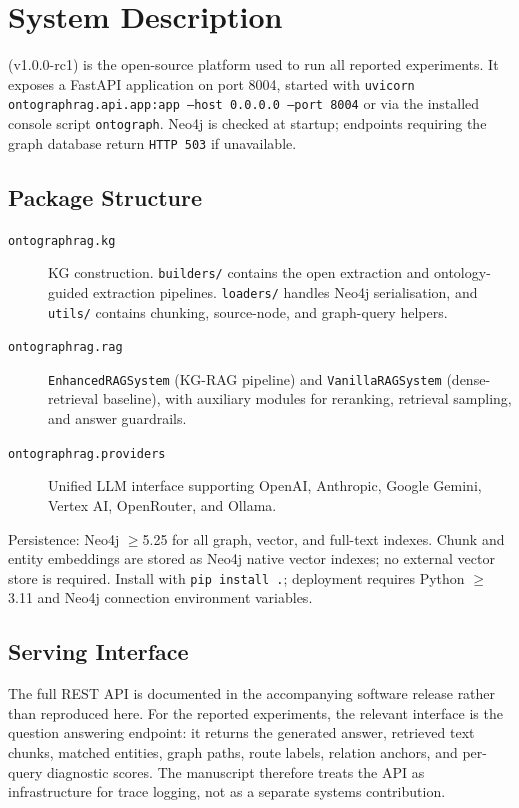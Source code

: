 \section{\system{} System Description}
\label{sec:appendix_ontographrag}

\system{} (v1.0.0-rc1) is the open-source platform used to run all
reported experiments.
It exposes a FastAPI application on port 8004, started with
\texttt{uvicorn ontographrag.api.app:app --host 0.0.0.0 --port 8004}
or via the installed console script \texttt{ontograph}.
Neo4j is checked at startup; endpoints requiring the graph database
return \texttt{HTTP 503} if unavailable.

\subsection{Package Structure}

\begin{description}
  \item[\texttt{ontographrag.kg}]
    KG construction. \texttt{builders/} contains the open extraction
    and ontology-guided extraction pipelines.
    \texttt{loaders/} handles Neo4j serialisation, and \texttt{utils/}
    contains chunking, source-node, and graph-query helpers.

  \item[\texttt{ontographrag.rag}]
    \texttt{EnhancedRAGSystem} (KG-RAG pipeline) and
    \texttt{VanillaRAGSystem} (dense-retrieval baseline), with auxiliary
    modules for reranking, retrieval sampling, and answer guardrails.

  \item[\texttt{ontographrag.providers}]
    Unified LLM interface supporting OpenAI, Anthropic, Google Gemini,
    Vertex AI, OpenRouter, and Ollama.
\end{description}

Persistence: Neo4j $\geq$5.25 for all graph, vector, and full-text indexes.
Chunk and entity embeddings are stored as Neo4j native vector indexes;
no external vector store is required.
Install with \texttt{pip install .}; deployment requires Python $\geq$3.11
and Neo4j connection environment variables.

\subsection{Serving Interface}

The full REST API is documented in the accompanying software release rather
than reproduced here.
For the reported experiments, the relevant interface is the question
answering endpoint: it returns the generated answer, retrieved text chunks,
matched entities, graph paths, route labels, relation anchors, and per-query
diagnostic scores.
The manuscript therefore treats the API as infrastructure for trace logging,
not as a separate systems contribution.


